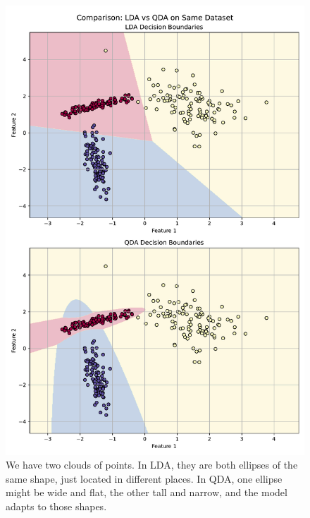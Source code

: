 \begin{figure}[!htp]
    \centering
    \includegraphics[width=\textwidth]{img/qda/lda-vs-qda.pdf}
    \caption{We have two clouds of points. In LDA, they are both ellipses of the same shape, just located in different places. In QDA, one ellipse might be wide and flat, the other tall and narrow, and the model adapts to those shapes.}
\end{figure}

\newpage

